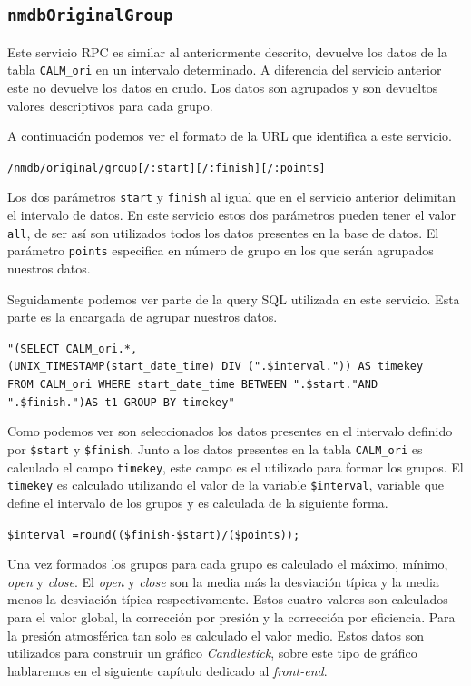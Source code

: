 	\subsection{\texttt{nmdbOriginalGroup}}
		Este servicio RPC es similar al anteriormente descrito, devuelve los datos de la tabla \texttt{CALM\_ori} en un intervalo determinado.
		A diferencia del servicio anterior este no devuelve los datos en crudo. Los datos son agrupados y son devueltos valores descriptivos
		para cada grupo.
		\par
		A continuación podemos ver el formato de la URL que identifica a este servicio.
			\begin{center} \texttt{/nmdb/original/group[/:start][/:finish][/:points]}  \end{center} 
		Los dos parámetros \texttt{start} y \texttt{finish} al igual que en el servicio anterior delimitan el intervalo de datos. En este
		servicio estos dos parámetros pueden tener el valor \texttt{all}, de ser así son utilizados todos los datos presentes en la base de
		datos. El parámetro \texttt{points} especifica en número de grupo en los que serán agrupados nuestros datos. 
		\par
		Seguidamente podemos ver parte de la query SQL utilizada en este servicio. Esta parte es la encargada de agrupar nuestros datos.
			\begin{center} \texttt{"(SELECT CALM\_ori.*,
			  		\\	(UNIX\_TIMESTAMP(start\_date\_time) DIV (".\$interval.")) AS timekey  
				      	\\	FROM CALM\_ori WHERE start\_date\_time BETWEEN \cc".\$start."\cc AND \cc".\$finish."\cc)AS t1  GROUP BY timekey"}
			\end{center} 
		Como podemos ver son seleccionados los datos presentes en el intervalo definido por \texttt{\$start} y \texttt{\$finish}. Junto a los
		datos presentes en la tabla \texttt{CALM\_ori} es calculado el campo \texttt{timekey}, este campo es el utilizado para formar los
		grupos. El \texttt{timekey} es calculado utilizando el valor de la variable \texttt{\$interval}, variable que define el intervalo de
		los grupos y es calculada de la siguiente forma.
			\begin{center} \texttt{\$interval =round((\$finish-\$start)/(\$points));}  \end{center} 
		Una vez formados los grupos para cada grupo es calculado el máximo, mínimo, \emph{open} y \emph{close}. El \emph{open} y \emph{close}
		son la media más la desviación típica y la media menos la desviación típica respectivamente. Estos cuatro valores son calculados para
		el valor global, la corrección por presión y la corrección por eficiencia. Para la presión atmosférica tan solo es calculado el valor
		medio. Estos datos son utilizados para construir un gráfico \emph{Candlestick}, sobre este tipo de gráfico hablaremos en el siguiente
		capítulo dedicado al \emph{front-end}.
